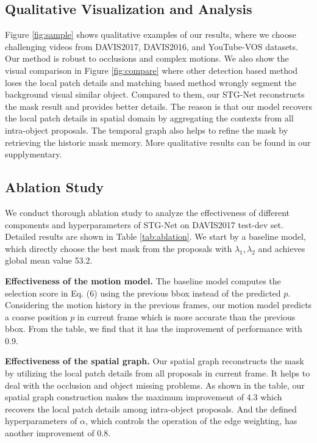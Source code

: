 \documentclass[letterpaper]{article} %
\begin{document}
\subsection{Qualitative Visualization and Analysis}
Figure \ref{fig:sample} shows qualitative examples of our results, where we choose challenging videos from DAVIS2017, DAVIS2016, and YouTube-VOS datasets. Our method is robust to occlusions and complex motions. We also show the visual comparison in Figure \ref{fig:compare} where other detection based method loses the local patch details and matching based method wrongly segment the background visual similar object. Compared to them, our STG-Net reconstructs the mask result and provides better details. The reason is that our model recovers the local patch details in spatial domain by aggregating the contexts from all intra-object proposals. The temporal graph also helps to refine the mask by retrieving the historic mask memory. More qualitative results can be found in our supplymentary.

\subsection{Ablation Study}
We conduct thorough ablation study to analyze the effectiveness of different components and hyperparameters of STG-Net on DAVIS2017 test-dev set. Detailed results are shown in Table \ref{tab:ablation}. We start by a baseline model, which directly choose the best mask from the proposals with $\lambda_1,\lambda_2$ and achieves global mean value 53.2.

\noindent \textbf{Effectiveness of the motion model.}
The baseline model computes the selection score in Eq. (6) using the previous bbox instead of the predicted $p$.
Considering the motion history in the previous frames, our motion model predicts a coarse position $p$ in current frame which is more accurate than the previous bbox. From the table, we find that it has the improvement of performance with 0.9.

\noindent \textbf{Effectiveness of the spatial graph.}
Our spatial graph reconstructs the mask by utilizing the local patch details from all proposals in current frame. It helps to deal with the occlusion and object missing problems. As shown in the table, our spatial graph construction makes the maximum improvement of 4.3 which recovers the local patch details among intra-object proposals. And the defined hyperparameters of $\alpha$, which controls the operation of the edge weighting, has another improvement of 0.8.
\end{document}
